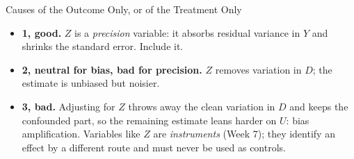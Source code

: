 \documentclass[aspectratio=169,11pt,xcolor=dvipsnames]{beamer}
\begin{document}
\begin{frame}{Causes of the Outcome Only, or of the Treatment Only}
\begin{center}
\end{center}
\begin{itemize}\itemsep1pt
  \item \textbf{1, good.} $Z$ is a \emph{precision} variable: it absorbs
        residual variance in $Y$ and shrinks the standard error. Include it.
  \item \textbf{2, neutral for bias, bad for precision.} $Z$ removes
        variation in $D$; the estimate is unbiased but noisier.
  \item \textbf{3, bad.} Adjusting for $Z$ throws away the clean variation
        in $D$ and keeps the confounded part, so the remaining estimate
        leans harder on $U$: \alert{bias amplification}. Variables like $Z$
        are \emph{instruments} (Week 7); they identify an effect by a
        different route and must never be used as controls.
\end{itemize}
\end{frame}
\end{document}
